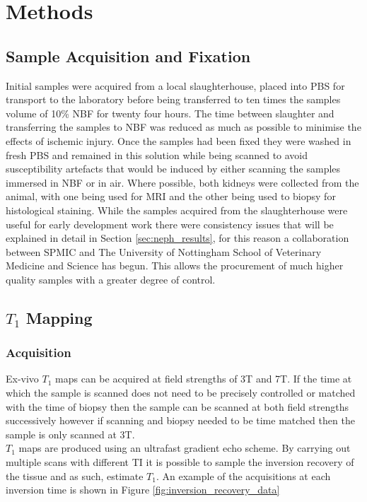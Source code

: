 \newpage
\section{Methods}
\label{sec:neph_methods}

\subsection{Sample Acquisition and Fixation}
\label{sec:fixation}
Initial samples were acquired from a local slaughterhouse, placed into \ac{PBS} for transport to the laboratory before being transferred to ten times the samples volume of 10\% \ac{NBF} for twenty four hours. The time between slaughter and transferring the samples to \ac{NBF} was reduced as much as possible to minimise the effects of ischemic injury. Once the samples had been fixed they were washed in fresh \ac{PBS} and remained in this solution while being scanned to avoid susceptibility artefacts that would be induced by either scanning the samples immersed in \ac{NBF} or in air. Where possible, both kidneys were collected from the animal, with one being used for \ac{MRI} and the other being used to biopsy for histological staining. While the samples acquired from the slaughterhouse were useful for early development work there were consistency issues that will be explained in detail in Section \ref{sec:neph_results}, for this reason a collaboration between \ac{SPMIC} and The University of Nottingham School of Veterinary Medicine and Science has begun. This allows the procurement of much higher quality samples with a greater degree of control. \\

\subsection{$T_1$ Mapping}
\subsubsection{Acquisition}

Ex-vivo $T_1$ maps can be acquired at field strengths of 3T and 7T. If the time at which the sample is scanned does not need to be precisely controlled or matched with the time of biopsy then the sample can be scanned at both field strengths successively however if scanning and biopsy needed to be time matched then the sample is only scanned at 3T.\\

$T_1$ maps are produced using an ultrafast gradient echo scheme. By carrying out multiple scans with different \ac{TI} it is possible to sample the inversion recovery of the tissue and as such, estimate $T_1$. An example of the acquisitions at each inversion time is shown in Figure \ref{fig:inversion_recovery_data}

